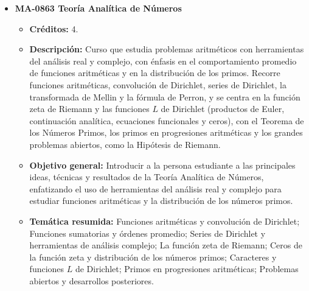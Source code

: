 \begin{itemize}[leftmargin=1.3em, itemsep=10pt, topsep=4pt, label={\color{Azul-UCR}$\blacksquare$}]
\item {\color{Azul-UCR}\textbf{MA-0863 Teoría Analítica de Números}}\par\nopagebreak\smallskip
\begin{itemize}[leftmargin=1.1em, itemsep=3pt, topsep=2pt, parsep=2pt, label={\textendash}]
\item \textbf{Créditos:} 4.
\item \textbf{Descripción:} Curso que estudia problemas aritméticos con herramientas del análisis real y complejo, con énfasis en el comportamiento promedio de funciones aritméticas y en la distribución de los primos. Recorre funciones aritméticas, convolución de Dirichlet, series de Dirichlet, la transformada de Mellin y la fórmula de Perron, y se centra en la función zeta de Riemann y las funciones $L$ de Dirichlet (productos de Euler, continuación analítica, ecuaciones funcionales y ceros), con el Teorema de los Números Primos, los primos en progresiones aritméticas y los grandes problemas abiertos, como la Hipótesis de Riemann.
\item \textbf{Objetivo general:} Introducir a la persona estudiante a las principales ideas, técnicas y resultados de la Teoría Analítica de Números, enfatizando el uso de herramientas del análisis real y complejo para estudiar funciones aritméticas y la distribución de los números primos.
\item \textbf{Temática resumida:} Funciones aritméticas y convolución de Dirichlet; Funciones sumatorias y órdenes promedio; Series de Dirichlet y herramientas de análisis complejo; La función zeta de Riemann; Ceros de la función zeta y distribución de los números primos; Caracteres y funciones $L$ de Dirichlet; Primos en progresiones aritméticas; Problemas abiertos y desarrollos posteriores.
\end{itemize}


\end{itemize}
